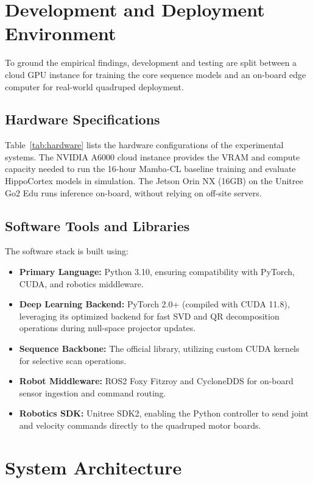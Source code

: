 \section{Development and Deployment Environment}
\label{sec:development_environment}

To ground the empirical findings, development and testing are split between a cloud GPU instance for training the core sequence models and an on-board edge computer for real-world quadruped deployment.

\subsection{Hardware Specifications}
Table~\ref{tab:hardware} lists the hardware configurations of the experimental systems. The NVIDIA A6000 cloud instance provides the VRAM and compute capacity needed to run the 16-hour Mamba-CL baseline training and evaluate HippoCortex models in simulation. The Jetson Orin NX (16GB) on the Unitree Go2 Edu runs inference on-board, without relying on off-site servers.



\subsection{Software Tools and Libraries}
The software stack is built using:
\begin{itemize}
    \item \textbf{Primary Language:} Python 3.10, ensuring compatibility with PyTorch, CUDA, and robotics middleware.
    \item \textbf{Deep Learning Backend:} PyTorch 2.0+ (compiled with CUDA 11.8), leveraging its optimized  backend for fast SVD and QR decomposition operations during null-space projector updates.
    \item \textbf{Sequence Backbone:} The official  library, utilizing custom CUDA kernels for selective scan operations.
    \item \textbf{Robot Middleware:} ROS2 Foxy Fitzroy and CycloneDDS for on-board sensor ingestion and command routing.
    \item \textbf{Robotics SDK:} Unitree SDK2, enabling the Python controller to send joint and velocity commands directly to the quadruped motor boards.
\end{itemize}

\section{System Architecture}
\label{sec:system_architecture}

